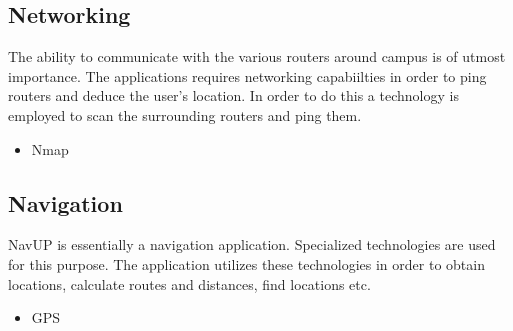 \documentclass{article}
\begin{document}
	\subsection{Networking}	
The ability to communicate with the various routers around campus is of utmost importance.  The applications requires networking capabiilties in order to ping routers and deduce the user's location.  In order to do this a technology is employed to scan the surrounding routers and ping them.
		\begin{itemize}
			\item Nmap
		\end{itemize}
	\subsection{Navigation}
NavUP is essentially a navigation application.  Specialized technologies are used for this purpose.  The application utilizes these technologies in order to obtain locations, calculate routes and distances, find locations etc.  
		\begin{itemize}
			\item GPS
		\end{itemize}
\end{document}
